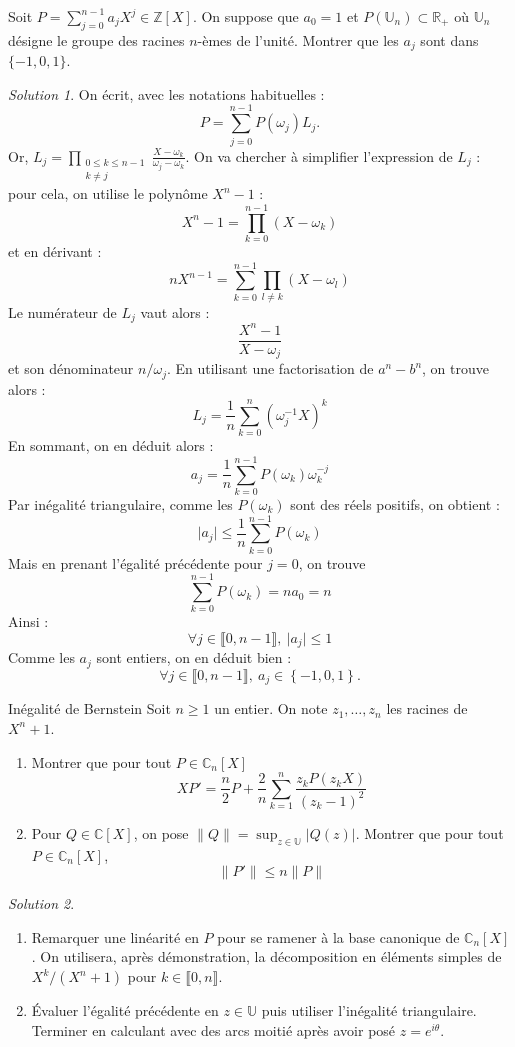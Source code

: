 \documentclass[french]{book}
\newcommand{\Z}{\mathbb{Z}}
\newcommand{\R}{\mathbb{R}}
\newcommand{\C}{\mathbb{C}}
\newcommand{\U}{\mathbb{U}}
\newcommand{\inv}{^{-1}}
\theoremstyle{definition}
\theoremstyle{remark}
\newtheorem*{sol}{Solution}
\begin{document}
\begin{exo}[2]{}
	Soit $P=\displaystyle\sum_{j=0}^{n-1}a_jX^j\in\Z[X]$. On suppose que $a_0=1$ et $P(\U_n)\subset\R_+$ où $\U_n$ désigne le groupe des racines $n$-èmes de l'unité. Montrer que les $a_j$ sont dans $\{-1,0,1\}$.
\end{exo}
\begin{sol}
	On écrit, avec les notations habituelles : $$P=\sum_{j=0}^{n-1}P(\omega_j)L_j.$$ Or, $L_j=\displaystyle\prod_{\substack{0\leqslant k\leqslant n-1\\ k\ne j}}\frac{X-\omega_k}{\omega_j-\omega_k}$. On va chercher à simplifier l'expression de $L_j$ : pour cela, on utilise le polynôme $X^n-1$ : $$X^n-1=\prod_{k=0}^{n-1}(X-\omega_k)$$ et en dérivant : $$nX^{n-1}=\sum_{k=0}^{n-1}\prod_{l\ne k}(X-\omega_l)$$ Le numérateur de $L_j$ vaut alors : $$\frac{X^n-1}{X-\omega_j}$$ et son dénominateur $n/\omega_j$. En utilisant une factorisation de $a^n-b^n$, on trouve alors : $$L_j=\frac{1}{n}\sum_{k=0}^{n}(\omega_j\inv X)^k$$ En sommant, on en déduit alors : $$a_j=\frac{1}{n}\sum_{k=0}^{n-1}P(\omega_k)\omega_k^{-j}$$ Par inégalité triangulaire, comme les $P(\omega_k)$ sont des réels positifs, on obtient : $$\lvert a_j\rvert\leqslant\frac{1}{n}\sum_{k=0}^{n-1}P(\omega_k)$$ Mais en prenant l'égalité précédente pour $j=0$, on trouve $$\sum_{k=0}^{n-1}P(\omega_k)=na_0=n$$ Ainsi : $$\forall j\in\llbracket0,n-1\rrbracket,\ \lvert a_j\rvert\leqslant 1$$ Comme les $a_j$ sont entiers, on en déduit bien : $$\forall j\in\llbracket0,n-1\rrbracket,\ a_j\in\left\{-1,0,1\right\}.$$
\end{sol}

\begin{exo}[2]{Inégalité de Bernstein}
	Soit $n\geqslant 1$ un entier. On note $z_1,\ldots,z_n$ les racines de $X^n+1$.
	\begin{enumerate}
		\item Montrer que pour tout $P\in\C_n[X]$ $$XP'=\frac{n}{2}P+\frac{2}{n}\sum_{k=1}^{n}\frac{z_kP(z_kX)}{(z_k-1)^2}$$
		\item Pour $Q\in\C[X]$, on pose $\lVert Q\rVert=\displaystyle\sup_{z\in\U}\lvert Q(z)\rvert$. Montrer que pour tout $P\in\C_n[X]$, $$\lVert P'\rVert\leqslant n\lVert P\rVert$$
	\end{enumerate}
\end{exo}
\begin{sol}
	\begin{enumerate}
		\item Remarquer une linéarité en $P$ pour se ramener à la base canonique de $\C_n[X]$. On utilisera, après démonstration, la décomposition en éléments simples de $X^k/(X^n+1)$ pour $k\in\llbracket 0,n\rrbracket$.
		\item Évaluer l'égalité précédente en $z\in\U$ puis utiliser l'inégalité triangulaire. Terminer en calculant avec des arcs moitié après avoir posé $z=e^{i\theta}$.
	\end{enumerate}
\end{sol}
\end{document}
